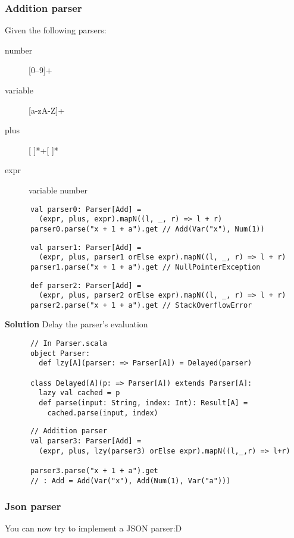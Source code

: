 \begin{frame}[fragile]
  \frametitle{Addition parser}
  \begin{overprint}
    Given the following parsers:
  
    \begin{multicols}{2}
      \begin{description}
        \item[number] [0--9]+
        \item[variable] [a-zA-Z]+
        \item[plus] [ ]*+[ ]*
        \item[expr] variable \textbar{} number
      \end{description}
    \end{multicols}
    \begin{lstlisting}
      val parser0: Parser[Add] =
        (expr, plus, expr).mapN((l, _, r) => l + r)
      parser0.parse("x + 1 + a").get // Add(Var("x"), Num(1))
    \end{lstlisting}
    \begin{lstlisting}
      val parser1: Parser[Add] =
        (expr, plus, parser1 orElse expr).mapN((l, _, r) => l + r)
      parser1.parse("x + 1 + a").get // NullPointerException
    \end{lstlisting}
    \begin{lstlisting}
      def parser2: Parser[Add] =
        (expr, plus, parser2 orElse expr).mapN((l, _, r) => l + r)
      parser2.parse("x + 1 + a").get // StackOverflowError
    \end{lstlisting}
    \textbf{Solution} Delay the parser's evaluation
    \begin{lstlisting}
      // In Parser.scala
      object Parser:
        def lzy[A](parser: => Parser[A]) = Delayed(parser)

      class Delayed[A](p: => Parser[A]) extends Parser[A]:
        lazy val cached = p
        def parse(input: String, index: Int): Result[A] =
          cached.parse(input, index)
    \end{lstlisting}
    \begin{lstlisting}
      // Addition parser
      val parser3: Parser[Add] =
        (expr, plus, lzy(parser3) orElse expr).mapN((l,_,r) => l+r)

      parser3.parse("x + 1 + a").get
      // : Add = Add(Var("x"), Add(Num(1), Var("a")))
    \end{lstlisting}
  \end{overprint}
\end{frame}

\begin{frame}
  \frametitle{Json parser}

  You can now try to implement a JSON parser\@:D

\end{frame}
